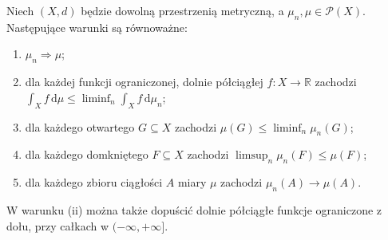 \begin{twierdzenie}[Portmanteau]
\label{thm:portmanteau-22}
Niech $(X,d)$ będzie dowolną przestrzenią metryczną,
a $\mu_n,\mu\in\mathcal P(X)$. Następujące warunki
są równoważne:
\begin{enumerate}[label=(\roman*)]
\item $\mu_n\Rightarrow\mu$;
\item dla każdej funkcji ograniczonej, dolnie półciągłej
$f:X\to\mathbb R$ zachodzi
$\int_Xf\,\mathrm d\mu\le\liminf_n\int_Xf\,\mathrm d\mu_n$;
\item dla każdego otwartego $G\subseteq X$ zachodzi
$\mu(G)\le\liminf_n\mu_n(G)$;
\item dla każdego domkniętego $F\subseteq X$ zachodzi
$\limsup_n\mu_n(F)\le\mu(F)$;
\item dla każdego zbioru ciągłości $A$ miary $\mu$
zachodzi $\mu_n(A)\to\mu(A)$.
\end{enumerate}
W warunku (ii) można także dopuścić dolnie półciągłe
funkcje ograniczone z dołu, przy całkach w $(-\infty,+\infty]$.
\end{twierdzenie}
